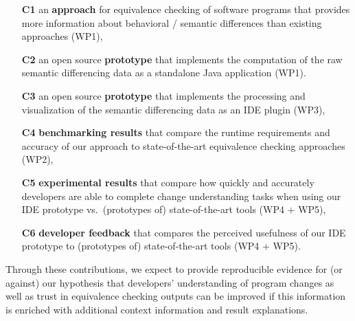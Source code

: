 \begin{itemize}
    \item[\textbf{C1}] an \textbf{approach} for equivalence checking of software programs that provides more information about behavioral / semantic differences than existing approaches (WP1),
    \item[\textbf{C2}] an open source \textbf{prototype} that implements the computation of the raw semantic differencing data as a standalone Java application (WP1).
    \item[\textbf{C3}] an open source \textbf{prototype} that implements the processing and visualization of the semantic differencing data as an IDE plugin (WP3),
    \item[\textbf{C4}] \textbf{benchmarking results} that compare the runtime requirements and accuracy of our approach to state-of-the-art equivalence checking approaches (WP2),
    \item[\textbf{C5}] \textbf{experimental results} that compare how quickly and accurately developers are able to complete change understanding tasks when using our IDE prototype vs.\ (prototypes of) state-of-the-art tools (WP4 + WP5),
    \item[\textbf{C6}] \textbf{developer feedback} that compares the perceived usefulness of our IDE prototype to (prototypes of) state-of-the-art tools (WP4 + WP5).
\end{itemize}

Through these contributions, we expect to provide reproducible evidence for (or against) our hypothesis that developers' understanding of program changes as well as trust in equivalence checking outputs can be improved if this information is enriched with additional context information and result explanations.

